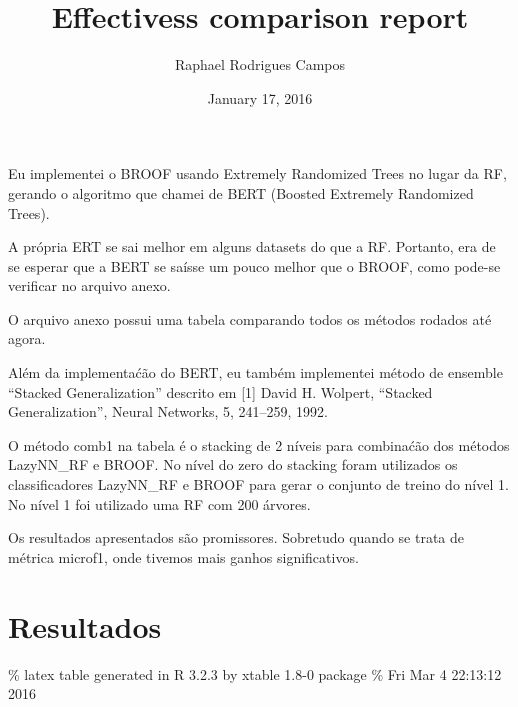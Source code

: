 \documentclass[]{article}
\title{Effectivess comparison report}
\author{Raphael Rodrigues Campos}
\date{January 17, 2016}
\begin{document}
\maketitle


Eu implementei o BROOF usando Extremely Randomized Trees no lugar da RF,
gerando o algoritmo que chamei de BERT (Boosted Extremely Randomized
Trees).

A própria ERT se sai melhor em alguns datasets do que a RF. Portanto,
era de se esperar que a BERT se saísse um pouco melhor que o BROOF, como
pode-se verificar no arquivo anexo.

O arquivo anexo possui uma tabela comparando todos os métodos rodados
até agora.

Além da implementaćão do BERT, eu também implementei método de ensemble
``Stacked Generalization'' descrito em {[}1{]} David H. Wolpert,
``Stacked Generalization'', Neural Networks, 5, 241--259, 1992.

O método comb1 na tabela é o stacking de 2 níveis para combinaćão dos
métodos LazyNN\_RF e BROOF. No nível do zero do stacking foram
utilizados os classificadores LazyNN\_RF e BROOF para gerar o conjunto
de treino do nível 1. No nível 1 foi utilizado uma RF com 200 árvores.

Os resultados apresentados são promissores. Sobretudo quando se trata de
métrica microf1, onde tivemos mais ganhos significativos.

\section{Resultados}\label{resultados}

\% latex table generated in R 3.2.3 by xtable 1.8-0 package \% Fri Mar 4
22:13:12 2016
\end{document}

